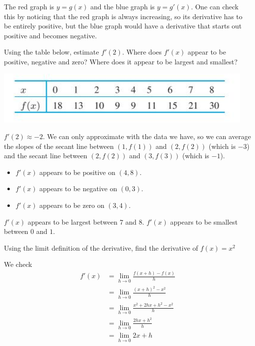 \documentclass[11pt]{exam}
\begin{document}
\begin{questions}
    \begin{solution}
      The red graph is \(y=g(x)\) and the blue graph is
      \(y=g'(x)\). One can check this by noticing that the red graph
      is always increasing, so its derivative has to be entirely
      positive, but the blue graph would have a derivative that starts
      out positive and becomes negative. 
    \end{solution}
  \question Using the table below, estimate $f'(2)$.  Where does $f'(x)$ appear to be positive, negative and zero?  Where does it appear to be largest and smallest?

    \includegraphics[width=5in]{Figures/table.jpg}	
    \begin{solution}
      \(f'(2) \approx -2\). We can only approximate with the data we
      have, so we can average the slopes of the secant line between
      \((1,f(1))\) and \((2,f(2))\) (which is \(-3\)) and the secant
      line between \((2,f(2))\) and \((3,f(3))\) (which is \(-1\)). 
      \begin{itemize}
      \item \(f'(x)\) appears to be positive on
        \((4,8)\).
      \item \(f'(x)\) appears to be negative on \((0,3)\).
      \item \(f'(x)\) appears to be zero on \((3,4)\).
      \end{itemize}
      \(f'(x)\) appears to be largest between \(7\) and
      \(8\). \(f'(x)\) appears to be smallest between \(0\) and \(1\).
    \end{solution}
  \question Using the limit definition of the derivative, find the
    derivative of \(f(x) = x^2\)
    \begin{solution}
      We check
      \begin{align*}
        f'(x)
        & = \lim_{h \to 0} \frac{f(x+h)-f(x)}{h}\\
        & = \lim_{h \to 0} \frac{(x+h)^2-x^2}{h}\\
        & = \lim_{h \to 0} \frac{x^2+2hx+h^2-x^2}{h}\\
        & = \lim_{h \to 0} \frac{2hx+h^2}{h}\\
        & = \lim_{h \to 0} 2x+h\\

\end{align*}
\end{solution}
\end{questions}
\end{document}
